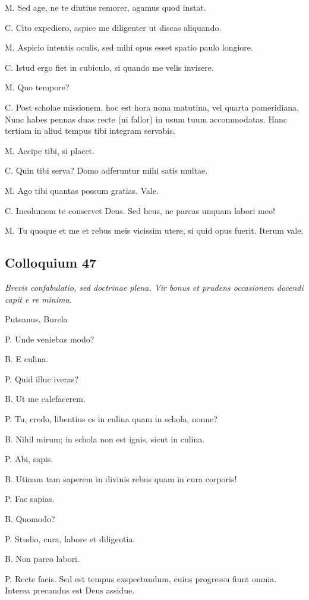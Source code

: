 \documentclass{article}
\begin{document}
M. Sed age, ne te diutius remorer, agamus quod instat. 

C. Cito expediero, aspice me diligenter ut discas aliquando. 

M. Aspicio intentis oculis, sed mihi opus esset spatio paulo longiore. 

C. Istud ergo fiet in cubiculo, si quando me velis invisere. 

M. Quo tempore?

C. Post scholae missionem, hoc est hora nona matutina, vel quarta pomeridiana. Nunc habes pennas duas recte (ni fallor) in usum tuum accommodatas. Hanc tertiam in aliud tempus tibi integram servabis. 

M. Accipe tibi, si placet. 

C. Quin tibi serva? Domo adferuntur mihi satis multae. 

M. Ago tibi quantas possum gratias. Vale. 

C. Incolumem te conservet Deus. Sed heus, ne parcas unquam labori meo!

M. Tu quoque et me et rebus meis vicissim utere, si quid opus fuerit. Iterum vale.

\subsection{Colloquium 47}
\emph{Brevis confabulatio, sed doctrinae plena. Vir bonus et prudens occasionem docendi capit e re minima.}

Puteanus, Burela

P. Unde veniebas modo?

B. E culina. 

P. Quid illuc iveras?

B. Ut me calefacerem. 

P. Tu, credo, libentius es in culina quam in schola, nonne?

B. Nihil mirum; in schola non est ignis, sicut in culina. 

P. Abi, sapis. 

B. Utinam tam saperem in divinis rebus quam in cura corporis!

P. Fac sapias. 

B. Quomodo?

P. Studio, cura, labore et diligentia. 

B. Non parco labori. 

P. Recte facis. Sed est tempus exspectandum, cuius progressu fiunt omnia. Interea precandus est Deus assidue. 
\end{document}
